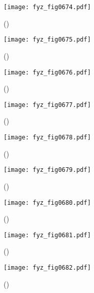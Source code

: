     \begin{figure}[ht!] %
      \centering
      \texttt{[image: fyz\_fig0674.pdf]}
      \caption{
               (\cite[s.~707]{Feynman02})}
      \label{fyz:fig0674}
    \end{figure}

    \begin{figure}[ht!] %
      \centering
      \texttt{[image: fyz\_fig0675.pdf]}
      \caption{
               (\cite[s.~707]{Feynman02})}
      \label{fyz:fig0675}
    \end{figure}

    \begin{figure}[ht!] %
      \centering
      \texttt{[image: fyz\_fig0676.pdf]}
      \caption{
               (\cite[s.~707]{Feynman02})}
      \label{fyz:fig0676}
    \end{figure}
    
    \begin{figure}[ht!] %
      \centering
      \texttt{[image: fyz\_fig0677.pdf]}
      \caption{
               (\cite[s.~707]{Feynman02})}
      \label{fyz:fig0677}
    \end{figure}

    \begin{figure}[ht!] %
      \centering
      \texttt{[image: fyz\_fig0678.pdf]}
      \caption{
               (\cite[s.~707]{Feynman02})}
      \label{fyz:fig0678}
    \end{figure}

    \begin{figure}[ht!] %
      \centering
      \texttt{[image: fyz\_fig0679.pdf]}
      \caption{
               (\cite[s.~707]{Feynman02})}
      \label{fyz:fig0679}
    \end{figure}

    \begin{figure}[ht!] %
      \centering
      \texttt{[image: fyz\_fig0680.pdf]}
      \caption{
               (\cite[s.~707]{Feynman02})}
      \label{fyz:fig0680}
    \end{figure}

    \begin{figure}[ht!] %
      \centering
      \texttt{[image: fyz\_fig0681.pdf]}
      \caption{
               (\cite[s.~707]{Feynman02})}
      \label{fyz:fig0681}
    \end{figure}

    \begin{figure}[ht!] %
      \centering
      \texttt{[image: fyz\_fig0682.pdf]}
      \caption{
               (\cite[s.~707]{Feynman02})}
      \label{fyz:fig0682}
    \end{figure}


